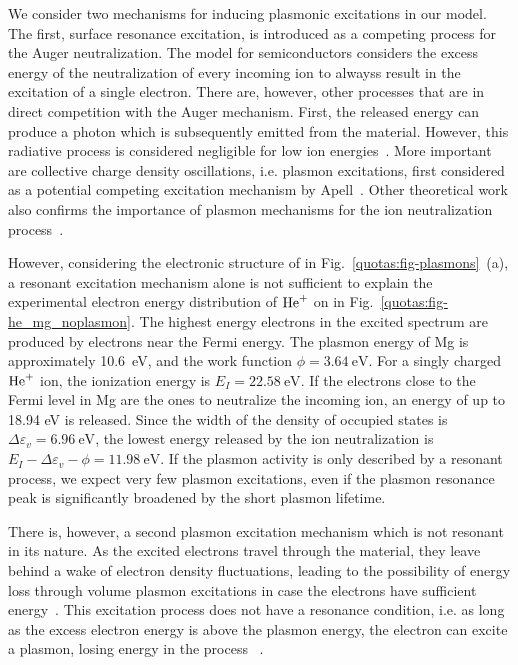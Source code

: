 \begin{refsection}
We consider two mechanisms for inducing plasmonic excitations in our model. 
The first, surface resonance excitation, is introduced as a competing process 
for the Auger neutralization. The model for semiconductors 
considers the excess energy of the neutralization of every incoming ion to alwayss
result in the excitation of a single electron. There are, however, other 
processes that are in direct competition with the Auger mechanism. First, the 
released energy can produce a photon which is subsequently emitted from the 
material. However, this radiative process is considered negligible for low ion 
energies~\cite{Almulhem1989}. More important are collective charge density 
oscillations, i.e. plasmon excitations, first considered as a potential competing 
excitation mechanism by Apell~\cite{Apell1988}. Other theoretical 
work also confirms the importance of plasmon mechanisms for the ion 
neutralization process~\cite{Almulhem1989, Monreal1995, VicenteAlvarez1998}.  

However, considering the electronic structure of  in Fig.~\ref{quotas:fig-plasmons}~(a), a resonant 
excitation mechanism alone is not sufficient to explain the experimental 
electron energy distribution of $\ce{He^+}$ on  in 
Fig.~\ref{quotas:fig-he_mg_noplasmon}. The highest energy electrons in the 
excited spectrum are produced by electrons near the Fermi energy. The plasmon 
energy of Mg is approximately 10.6~\si{\electronvolt}, and the work function 
$\phi = 3.64~\si{\electronvolt}$. For a singly charged $\ce{He^+}$ 
ion, the ionization energy is $E_I = 22.58~\si{\electronvolt}$. If the electrons close 
to the Fermi level in Mg are the ones to neutralize the incoming ion, an 
energy of up to 18.94 eV is released. Since the width of the density of 
occupied states is $\Delta \varepsilon_{v} = 6.96~\si{\electronvolt}$, the 
lowest energy released by the ion neutralization is $E_I - \Delta\varepsilon_{v} - \phi = 11.98~\si{\electronvolt}$. 
If the plasmon activity is only described by a resonant 
process, we expect very few plasmon excitations, even if the plasmon 
resonance peak is significantly broadened by the short plasmon lifetime.

There is, however, a second plasmon excitation mechanism which is not 
resonant in its nature. As the excited electrons travel through the material, 
they leave behind a wake of electron density fluctuations, leading to the 
possibility of energy loss through volume plasmon excitations in case the 
electrons have sufficient energy~\cite{Ritchie1957}. This excitation process does not have a 
resonance condition, i.e. as long as the excess electron energy is above the 
plasmon energy, the electron can excite a plasmon, losing energy in the process 
~\cite{Baragiola2001}.


\end{refsection}
